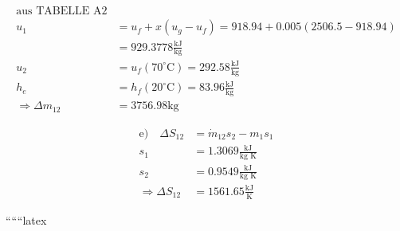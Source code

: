 \begin{align*}
\text{aus TABELLE A2} \\
u_1 &= u_f + x \left( u_g - u_f \right) = 918.94 + 0.005 \left( 2506.5 - 918.94 \right) \\
&= 929.3778 \frac{\text{kJ}}{\text{kg}} \\
u_2 &= u_f (70^\circ \text{C}) = 292.58 \frac{\text{kJ}}{\text{kg}} \\
h_e &= h_f (20^\circ \text{C}) = 83.96 \frac{\text{kJ}}{\text{kg}} \\
\Rightarrow \Delta m_{12} &= 3756.98 \text{kg}
\end{align*}

\begin{align*}
\text{e)} \quad \Delta S_{12} &= \dot{m}_{12} s_2 - m_1 s_1 \\
s_1 &= 1.3069 \frac{\text{kJ}}{\text{kg K}} \\
s_2 &= 0.9549 \frac{\text{kJ}}{\text{kg K}} \\
\Rightarrow \Delta S_{12} &= 1561.65 \frac{\text{kJ}}{\text{K}}
\end{align*}

``````latex



